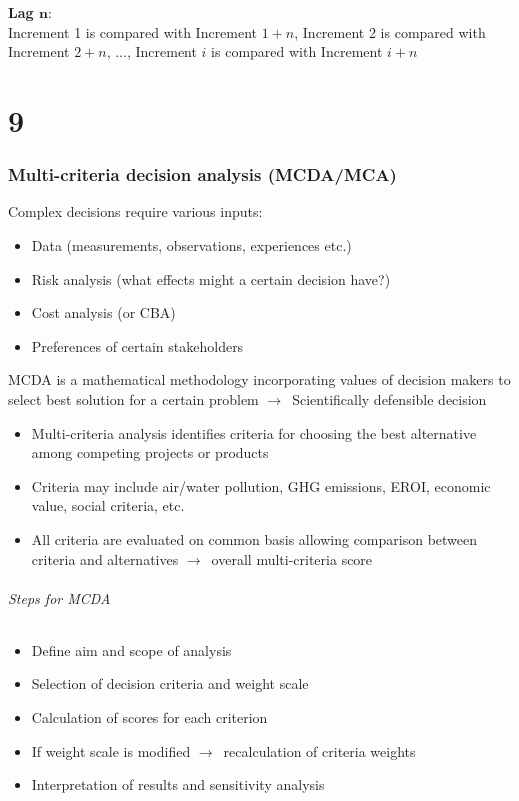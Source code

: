 \documentclass{article}
\begin{document}
\textbf{Lag $\mathbf{n}$}:\\
Increment 1 is compared with Increment $1+n$, Increment 2 is compared with
Increment $2+n$, ..., Increment $i$ is compared with Increment $i+n$

\part{9}
\section{Multi-criteria decision analysis (MCDA/MCA)}
Complex decisions require various inputs:
\begin{itemize}
    \item Data (measurements, observations, experiences etc.)
    \item Risk analysis (what effects might a certain decision have?)
    \item Cost analysis (or CBA)
    \item Preferences of certain stakeholders
\end{itemize}

MCDA is a mathematical methodology incorporating values of decision makers to select best
solution for a certain problem $\to$\ Scientifically defensible decision
\begin{itemize}
    \item Multi-criteria analysis identifies criteria for choosing the best alternative among competing projects or products
    \item Criteria may include air/water pollution, GHG emissions, EROI, economic value, social criteria, etc.
    \item All criteria are evaluated on common basis allowing comparison between criteria and alternatives $\to$\ overall multi-criteria score
\end{itemize}

\paragraph{\color{red}Steps for MCDA}
\begin{itemize}
    \item Define aim and scope of analysis
    \item Selection of decision criteria and weight scale
    \item Calculation of scores for each criterion
    \item If weight scale is modified $\to$\ recalculation of criteria weights
    \item Interpretation of results and sensitivity analysis
\end{itemize}
\end{document}
